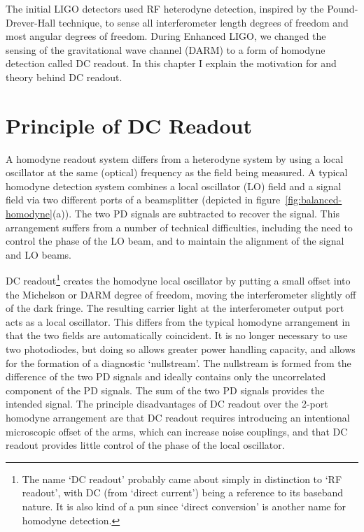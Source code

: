 \label{chapter3}

The initial LIGO detectors used RF heterodyne detection, inspired by
the Pound-Drever-Hall technique, to sense all interferometer length
degrees of freedom and most angular degrees of freedom.  During
Enhanced LIGO, we changed the sensing of the gravitational wave channel (DARM)
to a form of homodyne detection called DC readout.  In
this chapter I explain the motivation for and theory behind DC
readout.

\section{Principle of DC Readout}
A homodyne readout system differs from a heterodyne system by using a
local oscillator at the same (optical) frequency as the field being
measured.  A typical homodyne detection system combines a local
oscillator (LO) field and a signal field via two different ports of a
beamsplitter (depicted in figure~\ref{fig:balanced-homodyne}(a)).  The
two PD signals are subtracted to recover the signal.  This arrangement
suffers from a number of technical
difficulties\cite{McKenzie2007Technical}, including the need to
control the phase of the LO beam, and to maintain the alignment of the
signal and LO beams.

DC readout\footnote{The name `DC readout' probably came about simply
in distinction to `RF readout', with DC (from `direct current') being a
reference to its baseband nature.  It is also
kind of a pun since `direct conversion' is another name for homodyne
detection.} creates the homodyne local oscillator by putting a small
offset into the Michelson or DARM degree of freedom, moving the
interferometer slightly off of the dark fringe.  The resulting carrier
light at the interferometer output port acts as a local oscillator.
This differs from the typical homodyne arrangement in that the two
fields are automatically coincident.  It is no longer necessary to use
two photodiodes, but doing so allows greater power handling capacity,
and allows for the formation of a diagnostic `nullstream'.  The
nullstream is formed from the difference of the two PD signals and
ideally contains only the uncorrelated component of the PD signals.
The sum of the two PD signals provides the intended signal.  The
principle disadvantages of DC readout over the 2-port homodyne
arrangement are that DC readout requires introducing an intentional
microscopic offset of the arms, which can increase noise couplings,
and that DC readout provides little control of the phase of the local
oscillator.

